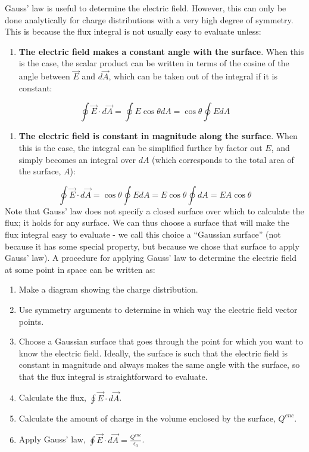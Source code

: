 Gauss' law is useful to determine the electric field. However, this can only be done analytically for charge distributions with a very high degree of symmetry. This is because the flux integral is not usually easy to evaluate unless:

\begin{enumerate}
\item \textbf{The electric field makes a constant angle with the surface}. When this is the case, the scalar product can be written in terms of the cosine of the angle between $\vec E$ and $d\vec A$, which can be taken out of the integral if it is constant:
\end{enumerate}
\begin{equation}
\oint \vec E\cdot d\vec A=\oint E\cos\theta dA=\cos\theta\oint EdA
\end{equation}
\begin{enumerate}[resume]
\item \textbf{The electric field is constant in magnitude along the surface}. When this is the case, the integral can be simplified further by factor out $E$, and simply becomes an integral over $dA$ (which corresponds to the total area of the surface, $A$):
\end{enumerate}
\begin{equation}
\oint \vec E\cdot d\vec A=\cos\theta\oint EdA =E\cos\theta\oint dA=EA\cos\theta
\end{equation}
Note that Gauss' law does not specify a closed surface over which to calculate the flux; it holds for any surface. We can thus choose a surface that will make the flux integral easy to evaluate - we call this choice a ``Gaussian surface'' (not because it has some special property, but because we chose that surface to apply Gauss' law). A procedure for applying Gauss' law to determine the electric field at some point in space can be written as:

\begin{enumerate}
\item Make a diagram showing the charge distribution.
\item Use symmetry arguments to determine in which way the electric field vector points.
\item Choose a Gaussian surface that goes through the point for which you want to know the electric field. Ideally, the surface is such that the electric field is constant in magnitude and always makes the same angle with the surface, so that the flux integral is straightforward to evaluate.
\item Calculate the flux, $\oint \vec E\cdot d\vec A$.
\item Calculate the amount of charge in the volume enclosed by the surface, $Q^{enc}$.
\item Apply Gauss' law, $\oint \vec E\cdot d\vec A=\frac{Q^{enc}}{\epsilon_0}$.
\end{enumerate}

